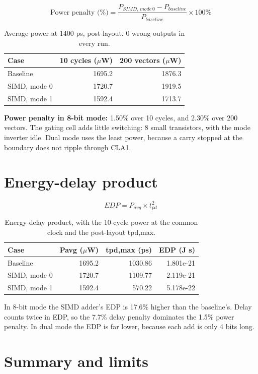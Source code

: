 \documentclass[11pt,a4paper]{article}
\begin{document}
\[ \text{Power penalty (\%)} = \frac{P_{SIMD,\,mode\,0} - P_{baseline}}{P_{baseline}} \times 100\% \]

\begin{table}[H]\centering\small
\caption{Average power at 1400 ps, post-layout. 0 wrong outputs in every run.}
\begin{tabular}{lrr}
\toprule
\textbf{Case} & \textbf{10 cycles ($\mu$W)} & \textbf{200 vectors ($\mu$W)} \\
\midrule
Baseline & 1695.2 & 1876.3 \\
SIMD, mode 0 & 1720.7 & 1919.5 \\
SIMD, mode 1 & 1592.4 & 1713.7 \\
\bottomrule
\end{tabular}
\end{table}

\textbf{Power penalty in 8-bit mode:} 1.50\% over 10 cycles, and 2.30\% over 200 vectors. The gating cell adds little switching: 8 small transistors, with the mode inverter idle. Dual mode uses the least power, because a carry stopped at the boundary does not ripple through CLA1.

\section{Energy-delay product}

\[ EDP = P_{avg} \times t_{pd}^2 \]

\begin{table}[H]\centering\small
\caption{Energy-delay product, with the 10-cycle power at the common clock and the post-layout tpd,max.}
\begin{tabular}{lrrr}
\toprule
\textbf{Case} & \textbf{Pavg ($\mu$W)} & \textbf{tpd,max (ps)} & \textbf{EDP (J s)} \\
\midrule
Baseline & 1695.2 & 1030.86 & 1.801e-21 \\
SIMD, mode 0 & 1720.7 & 1109.77 & 2.119e-21 \\
SIMD, mode 1 & 1592.4 & 570.22 & 5.178e-22 \\
\bottomrule
\end{tabular}
\end{table}

In 8-bit mode the SIMD adder's EDP is 17.6\% higher than the baseline's. Delay counts twice in EDP, so the 7.7\% delay penalty dominates the 1.5\% power penalty. In dual mode the EDP is far lower, because each add is only 4 bits long.

\section{Summary and limits}
\end{document}
